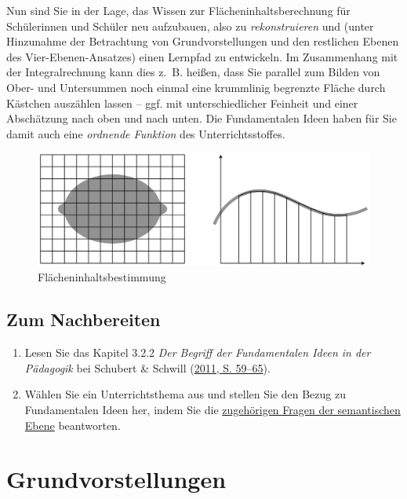 \documentclass[
]{scrbook}
\providecommand{\tightlist}{%
  \setlength{\itemsep}{0pt}\setlength{\parskip}{0pt}}
\theoremstyle{definition}
\theoremstyle{definition}
\theoremstyle{definition}
\theoremstyle{definition}
\theoremstyle{remark}
\begin{document}
Nun sind Sie in der Lage, das Wissen zur Flächeninhaltsberechnung für Schülerinnen und Schüler neu aufzubauen, also zu \emph{rekonstruieren} und (unter Hinzunahme der Betrachtung von Grundvorstellungen und den restlichen Ebenen des Vier-Ebenen-Ansatzes) einen Lernpfad zu entwickeln. Im Zusammenhang mit der Integralrechnung kann dies z.~B. heißen, dass Sie parallel zum Bilden von Ober- und Untersummen noch einmal eine krummlinig begrenzte Fläche durch Kästchen auszählen lassen -- ggf. mit unterschiedlicher Feinheit und einer Abschätzung nach oben und nach unten. Die Fundamentalen Ideen haben für Sie damit auch eine \emph{ordnende Funktion} des Unterrichtsstoffes.

\begin{figure}

{\centering \includegraphics[width=0.75\linewidth]{pictures/2-Flaeche} 

}

\caption{Flächeninhaltsbestimmung}\label{fig:Flaeche}
\end{figure}

\hypertarget{fundamentale-ideen-nachbereitung}{%
\section{Zum Nachbereiten}\label{fundamentale-ideen-nachbereitung}}

\begin{enumerate}
\def\labelenumi{\arabic{enumi}.}
\tightlist
\item
  Lesen Sie das Kapitel 3.2.2 \emph{Der Begriff der Fundamentalen Ideen in der Pädagogik} bei Schubert \& Schwill (\protect\hyperlink{ref-Schubert:2011}{2011, S. 59--65}).
\item
  Wählen Sie ein Unterrichtsthema aus und stellen Sie den Bezug zu Fundamentalen Ideen her, indem Sie die \protect\hyperlink{tab:fragen-ebenen}{zugehörigen Fragen der semantischen Ebene} beantworten.
\end{enumerate}

\hypertarget{grundvorstellungen}{%
\chapter{Grundvorstellungen}\label{grundvorstellungen}}
\end{document}
